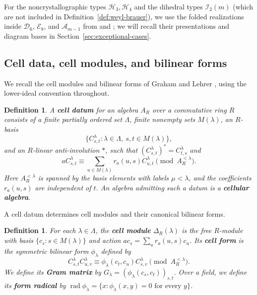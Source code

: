 \documentclass[11pt,a4paper]{amsart}
\theoremstyle{uprightdefinition}
\newtheorem{definition}[theorem]{Definition}
\theoremstyle{remark}\newtheorem{remark}[theorem]{Remark}
\begin{document}
For the noncrystallographic types $\mathscr{H}_3,\mathscr{H}_4$ and the dihedral types $\mathscr{I}_2(m)$ (which are not included in Definition~\ref{def:weyl-brauer}), we use the folded realizations inside $\mathscr{D}_6$, $\mathscr{E}_8$, and $\mathscr{A}_{m-1}$ from \cite[Theorems~1.1--1.2]{Liu2016} and
\cite[Theorem~1.6]{LiuI22014}; we will recall their presentations and diagram
bases in Section~\ref{sec:exceptional-cases}.

\subsection{Cell data, cell modules, and bilinear forms}
We recall the cell modules and bilinear forms of Graham and Lehrer
\cite{GL1996}, using the lower-ideal convention throughout.

\begin{definition}\label{def:cellular}
\cite[Definition~1.1]{GL1996}
A \textbf{cell datum}
for an algebra $A_R$
over a commutative ring $R$ consists of a finite partially ordered set
$\Lambda$, finite nonempty sets $M(\lambda)$, an $R$-basis
\[
 \{C^\lambda_{s,t}:\lambda\in\Lambda,\ s,t\in M(\lambda)\},
\]
and an $R$-linear anti-involution $*$, such that
$(C^\lambda_{s,t})^*=C^\lambda_{t,s}$ and
\begin{equation}\label{eq:cell-axiom-expanded}
 aC^\lambda_{s,t}\equiv
 \sum_{u\in M(\lambda)}r_a(u,s)C^\lambda_{u,t}
 \pmod{A_R^{<\lambda}}.
\end{equation}
Here $A_R^{<\lambda}$ is spanned by the basis elements with labels
$\mu<\lambda$, and the coefficients $r_a(u,s)$ are independent of $t$.
An algebra admitting such a datum is a \textbf{cellular algebra}.
\end{definition}

A cell datum determines cell modules and their canonical bilinear forms.

\begin{definition}\label{def:cell-module-form}
\cite[Definitions~2.1, 2.3 and~3.1, Proposition~2.4]{GL1996}
For each $\lambda\in\Lambda$, the \textbf{cell module} $\Delta_R(\lambda)$ is the free $R$-module with basis $\{c_s:s\in M(\lambda)\}$ and action
$ac_s=\sum_u r_a(u,s)c_u$. Its \textbf{cell form} is the symmetric bilinear form
$\phi_\lambda$ defined by
\begin{equation}\label{eq:cell-form-expanded}
 C^\lambda_{s,t}C^\lambda_{u,v}
 \equiv\phi_\lambda(c_t,c_u)C^\lambda_{s,v}
 \pmod{A_R^{<\lambda}}.
\end{equation}
We define its \textbf{Gram matrix} by
$G_\lambda=(\phi_\lambda(c_s,c_t))_{s,t}$. Over a field, we define its
\textbf{form radical} by
$\operatorname{rad}\phi_\lambda=\{x:\phi_\lambda(x,y)=0
\text{ for every }y\}$.
\end{definition}
\end{document}

